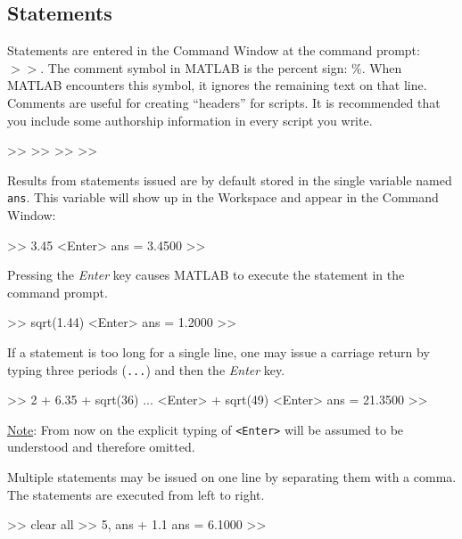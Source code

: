 \subsection{Statements} \label{sec.matlab.statements}
Statements are entered in the Command Window at the command prompt: $>>$.  The comment symbol in MATLAB is the percent sign: \%.  When MATLAB encounters this symbol, it ignores the remaining text on that line.  Comments are useful for creating ``headers'' for scripts.  It is recommended that you include some authorship information in every script you write.

\begin{codex}
>> %
>> %
>> %
>> %
\end{codex}

\par
Results from statements issued are by default stored in the single variable named \verb=ans=.  This variable will show up in the Workspace and appear in the Command Window:

\begin{codex}
>> 3.45                         <Enter>
ans =
        3.4500
>>
\end{codex}

\par
Pressing the \textit{Enter} key causes MATLAB to execute the statement in the command prompt.

\begin{codex}
>> sqrt(1.44)                   <Enter>
ans =
        1.2000
>>
\end{codex}

\par
If a statement is too long for a single line, one may issue a carriage return by typing three periods (\verb=...=) and then the \textit{Enter} key.

\begin{codex}
>> 2 + 6.35 + sqrt(36) ...      <Enter>
+ sqrt(49)                      <Enter>
ans =
        21.3500
>>
\end{codex}
\uline{Note}: From now on the explicit typing of \verb=<Enter>= will be assumed to be understood and therefore omitted.
\par
Multiple statements may be issued on one line by separating them with a comma.  The statements are executed from left to right.

\begin{codex}
>> clear all
>> 5, ans + 1.1
ans =
        6.1000
>>
\end{codex}

